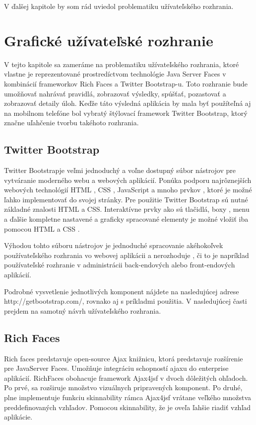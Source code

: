 V ďalšej kapitole by som rád uviedol problematiku užívateľského rozhrania.
\chapter{Grafické užívateľské rozhranie}
V tejto kapitole sa zameráme na problematiku užívateľského rozhrania, ktoré vlastne je reprezentované prostredíctvom technológie Java Server Faces v kombinácií frameworkov Rich Faces a Twitter Bootstrap-u. Toto rozhranie bude umožňovať nahrávať pravidlá, zobrazovať výsledky, spúšťať, pozastovať a zobrazovať detaily úloh. Keďže táto výsledná aplikácia by mala byť použíteľná aj na mobilnom telefóne bol vybratý štýlovací framework Twitter Bootstrap, ktorý značne uľahčenie tvorbu takéhoto rozhrania.

\section{Twitter Bootstrap}
Twitter Bootstrapje veľmi jednoduchý a voľne dostupný súbor nástrojov pre vytváranie moderného webu a webových aplikácií.\cite{boot} Ponúka podporu najrôznejších webových technológií HTML , CSS , JavaScript a mnoho prvkov , ktoré je možné ľahko implementovať do svojej stránky. Pre použitie Twitter Bootstrap sú nutné základné znalosti HTML a CSS. Interaktívne prvky ako sú tlačidlá, boxy , menu a ďalšie kompletne nastavené a graficky spracované elementy je možné vložiť iba pomocou HTML a CSS .

Výhodou tohto súboru nástrojov je jednoduché spracovanie akéhokoľvek používateľského rozhrania vo webovej aplikácii a nerozhoduje , či to je napríklad používateľské rozhranie v administrácii back-endových alebo front-endových aplikácií.


Podrobné vysvetlenie jednotlivých komponent nájdete na nasledujúcej adrese http://getbootstrap.com/, rovnako aj s príkladmi použitia. V nasledujúcej časti prejdem na samotný návrh užívateľského rozhrania.

\section{Rich Faces}
Rich faces predstavuje open-source Ajax knižnicu, ktorá predstavuje rozšírenie pre JavaServer Faces. Umožňuje integráciu schopností ajaxu do enterprise aplikácií. RichFaces obohacuje framework Ajax4jsf v dvoch dôležitých ohľadoch. Po prvé, sa rozširuje množstvo vizuálnych pripravených komponent. Po druhé,  plne implementuje funkciu skinnability rámca Ajax4jsf vrátane veľkého množstva preddefinovaných vzhľadov. Pomocou skinnability, že je oveľa ľahšie riadiť vzhľad aplikácie.


